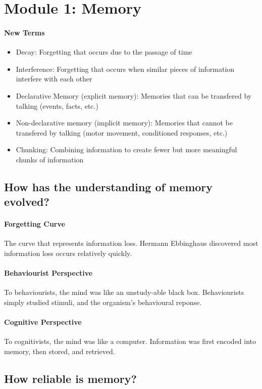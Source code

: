 \documentclass[10pt,letter]{article}
\theoremstyle{plain}
\theoremstyle{definition}
\begin{document}
\section*{Module 1: Memory}
\paragraph{New Terms}
\begin{itemize}
    \item Decay: Forgetting that occurs due to the passage of time 
    \item Interference: Forgetting that occurs when similar pieces of information interfere with each other 
    \item Declarative Memory (explicit memory): Memories that can be transfered by talking (events, facts, etc.) 
    \item Non-declarative memory (implicit memory): Memories that cannot be transfered by talking (motor movement, conditioned responses, etc.)
    \item Chunking: Combining information to create fewer but more meaningful chunks of information
\end{itemize}


\subsection*{How has the understanding of memory evolved?}
\paragraph{Forgetting Curve}
The curve that represents information loss. Hermann Ebbinghaus discovered most information loss occurs relatively quickly. 

\paragraph{Behaviourist Perspective}
To behaviourists, the mind was like an unstudy-able black box. Behaviourists simply studied stimuli, and the organism's behavioural reponse. 
\paragraph{Cognitive Perspective}
To cognitivists, the mind was like a computer. Information was first encoded into memory, then stored, and retrieved. 

\subsection*{How reliable is memory?}
\end{document}
